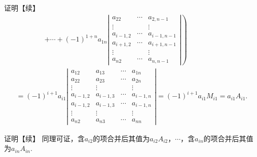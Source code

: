 \begin{frame}
  \begin{block}{证明【续】}
    $$
    \begin{array}{l}     
      \qquad\qquad \left. + \cdots  +  (-1)^{1+n} a_{1n}  \left|
      \begin{array}{ccc}
        a_{22}   & \cdots & a_{2,n-1}\\
        \vdots & & \vdots \\
        a_{i-1,2}   & \cdots & a_{i-1,n-1}\\
        a_{i+1,2}   & \cdots & a_{i+1,n-1}\\
        \vdots  & & \vdots \\
        a_{n2}   & \cdots & a_{n,n-1}
      \end{array}
      \right| \right) \\[0.4in]
      = (-1)^{i+1}a_{i1} \left|
      \begin{array}{cccc}
        a_{12} & a_{13} & \cdots & a_{1n} \\
        a_{22} & a_{23} & \cdots & a_{2n}\\
        \vdots & \vdots & & \vdots \\
        a_{i-1,2} & a_{i-1,3}   & \cdots & a_{i-1,n}\\    
        a_{i-1,2} & a_{i-1,3}   & \cdots & a_{i-1,n}\\
        \vdots & \vdots & & \vdots \\
        a_{n2}  & a_{n3} & \cdots & a_{nn}
      \end{array}
      \right| = (-1)^{i+1}a_{i1} M_{i1} = a_{i1} A_{i1}.
    \end{array}
    $$
  \end{block}
\end{frame}


\begin{frame}
  \begin{block}{证明【续】}
    同理可证，含$a_{i2}$的项合并后其值为$a_{i2}A_{i2}$，$\cdots$，含$a_{in}$的项合并后其值为$a_{in}A_{in}$.  

  \end{block}
\end{frame}




